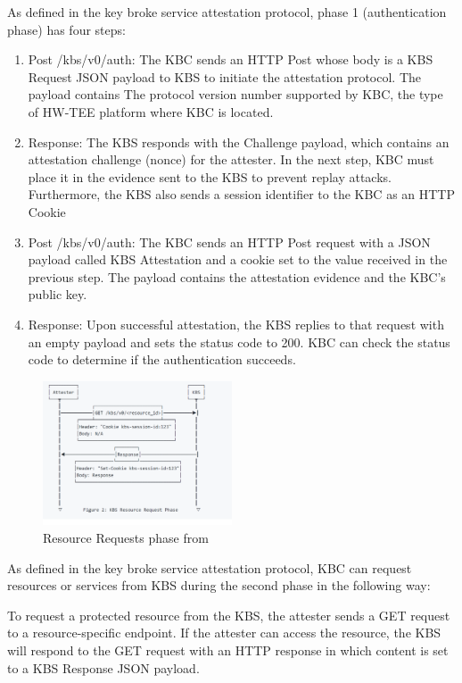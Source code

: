 As defined in the key broke service attestation protocol, phase 1 (authentication phase) has four steps: 
\begin{displayquote}
    \begin{enumerate}
        \item  Post /kbs/v0/auth: The KBC sends an HTTP Post whose body is a KBS Request JSON payload to KBS to initiate the attestation protocol. The payload contains The protocol version number supported by KBC, the type of HW-TEE platform where KBC is located.
        \item  Response: The KBS responds with the Challenge payload, which contains an attestation challenge (nonce) for the attester. In the next step, KBC must place it in the evidence sent to the KBS to prevent replay attacks. Furthermore, the KBS also sends a session identifier to the KBC as an HTTP Cookie
        \item  Post /kbs/v0/auth: The KBC sends an HTTP Post request with a JSON payload called KBS Attestation and a cookie set to the value received in the previous step. The payload contains the attestation evidence and the KBC’s public key.
        \item  Response: Upon successful attestation, the KBS replies to that request with an empty payload and sets the status code to 200. KBC can check the status code to determine if the authentication succeeds. 
    \end{enumerate}
\end{displayquote}

\begin{figure}[htp]
    \centering
    \includegraphics[width=0.5\textwidth]{images/resourcerequrie.PNG}
    \caption[Resource Requests phase]{Resource Requests phase from~\cite*{kbs_Attestation_protocol}}
    \label{fig:resourcerequrie}
\end{figure}
As defined in the key broke service attestation protocol, \acrshort{KBC} can request resources or services from KBS during the second phase in the following way:
\begin{displayquote}
  To request a protected resource from the KBS, the attester sends a GET request to a resource-specific endpoint. If the attester can access the resource, the KBS will respond to the GET request with an HTTP response in which content is set to a KBS Response JSON payload.
\end{displayquote}


